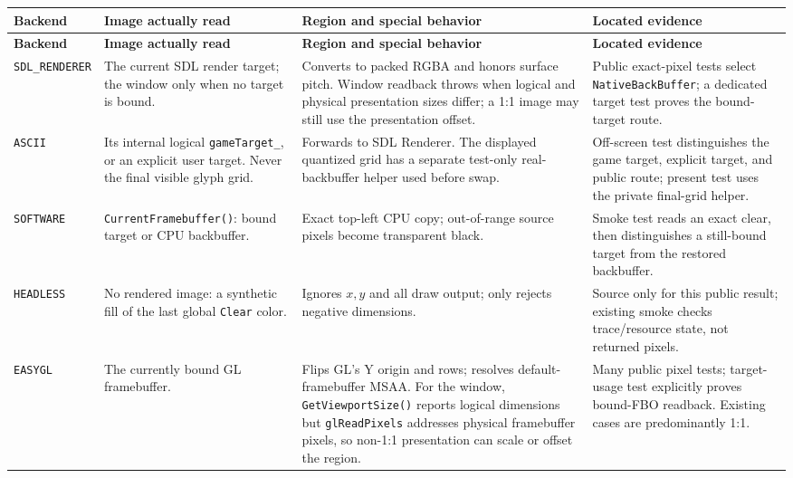 \begingroup
\small
\setlength{\tabcolsep}{3.2pt}
\renewcommand{\arraystretch}{1.13}
\begin{longtable}{@{}p{}p{}p{}p{}@{}}
\toprule
\textbf{Backend} & \textbf{Image actually read} & \textbf{Region and special behavior} &
  \textbf{Located evidence} \\
\midrule
\endfirsthead
\toprule
\textbf{Backend} & \textbf{Image actually read} & \textbf{Region and special behavior} &
  \textbf{Located evidence} \\
\midrule
\endhead
\texttt{SDL\_\allowbreak RENDERER}
  & The current SDL render target; the window only when no target is bound.
  & Converts to packed RGBA and honors surface pitch. Window readback throws when logical and
    physical presentation sizes differ; a 1:1 image may still use the presentation offset.
  & Public exact-pixel tests select \texttt{NativeBackBuffer}; a dedicated target test proves
    the bound-target route. \\
\texttt{ASCII}
  & Its internal logical \texttt{gameTarget\_}, or an explicit user target. Never the final
    visible glyph grid.
  & Forwards to SDL Renderer. The displayed quantized grid has a separate test-only
    real-backbuffer helper used before swap.
  & Off-screen test distinguishes the game target, explicit target, and public route; present
    test uses the private final-grid helper. \\
\texttt{SOFTWARE}
  & \texttt{CurrentFramebuffer()}: bound target or CPU backbuffer.
  & Exact top-left CPU copy; out-of-range source pixels become transparent black.
  & Smoke test reads an exact clear, then distinguishes a still-bound target from the
    restored backbuffer. \\
\texttt{HEADLESS}
  & No rendered image: a synthetic fill of the last global \texttt{Clear} color.
  & Ignores \(x,y\) and all draw output; only rejects negative dimensions.
  & Source only for this public result; existing smoke checks trace/resource state, not
    returned pixels. \\
\texttt{EASYGL}
  & The currently bound GL framebuffer.
  & Flips GL's Y origin and rows; resolves default-framebuffer MSAA. For the window,
    \texttt{GetViewportSize()} reports logical dimensions but \texttt{glReadPixels} addresses
    physical framebuffer pixels, so non-1:1 presentation can scale or offset the region.
  & Many public pixel tests; target-usage test explicitly proves bound-FBO readback. Existing
    cases are predominantly 1:1. \\

\end{longtable}
